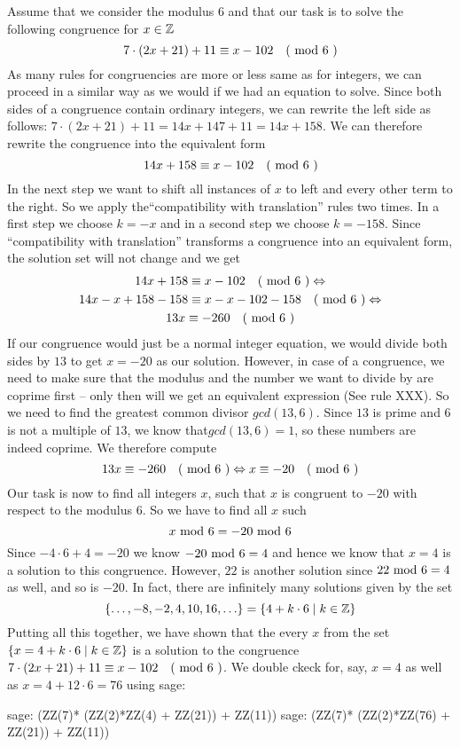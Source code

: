 \begin{example}
\label{example_first_congruence}
Assume that we consider the modulus $6$ and that our task is to solve the following congruence for $x\in \mathbb{Z}$
$$7\cdot(2x+21) + 11 \equiv x-102 \quad \text{( mod } 6 \text{ )}$$
As many rules for congruencies are more or less same as for integers, we can proceed in a  similar way as we would if we had an equation to solve.
Since both sides of a congruence contain ordinary integers, we can rewrite the left side as follows: $7\cdot(2x+21) + 11 = 14x + 147 + 11 = 14x +158$. We can therefore rewrite the congruence into the equivalent form
$$14x +158 \equiv x-102 \quad \text{( mod } 6 \text{ )}$$
In the next step we want to shift all instances of $x$ to left and every other term to the right. So we apply the``compatibility with translation'' rules two times. In a first step we choose $k=-x$ and in a second step we choose $k=-158$. Since ``compatibility with translation'' transforms a congruence into an equivalent form, the solution set will not change and we get
\begin{multline*}
14x +158 \equiv x-102 \quad \text{( mod } 6 \text{ )} \Leftrightarrow\\
14x-x +158-158 \equiv x-x-102-158 \quad \text{( mod } 6 \text{ )} \Leftrightarrow \\
13x \equiv -260 \quad \text{( mod } 6 \text{ )}
\end{multline*}
If our congruence would just be a normal integer equation, we would divide both sides by $13$ to get $x=-20$ as our solution. However, in case of a congruence, we need to make sure that the modulus and the number we want to divide by are coprime first – only then will we get an equivalent expression (See rule XXX). So we need to find the greatest common divisor $gcd(13,6)$. Since $13$ is prime and $6$ is not a multiple of $13$, we know that$gcd(13,6)=1$, so these numbers are indeed coprime. We therefore compute
$$
13x \equiv -260 \quad \text{( mod } 6 \text{ )} \Leftrightarrow x \equiv -20 \quad \text{( mod } 6 \text{ )}
$$
Our task is now to find all integers $x$, such that $x$ is congruent to $-20$ with respect to the modulus $6$. So we have to find all $x$ such
$$
x \text{ mod } 6 = -20 \text{ mod } 6
$$
Since $-4\cdot 6 +4 = -20$ we know $ -20 \text{ mod } 6 = 4$ and hence we know that $x=4$ is a solution to this congruence. However, $22$ is another solution since $ 22 \text{ mod } 6 = 4$ as well, and so is $-20$. In fact, there are infinitely many solutions given by the set
$$
\{\ldots, -8,-2, 4,10, 16,\ldots\} = \{4+k\cdot 6 \;|\; k\in \mathbb{Z}\}
$$
Putting all this together, we have shown that the every $x$ from the set $\{x=4+k\cdot 6 \;|\; k\in \mathbb{Z}\}$ is a solution to the congruence $7\cdot(2x+21) + 11 \equiv x-102 \quad \text{( mod } 6 \text{ )}$. We double ckeck for, say, $x=4$ as well as $x=4 + 12\cdot 6 = 76$ using sage:
\begin{sagecommandline}
sage: (ZZ(7)* (ZZ(2)*ZZ(4) + ZZ(21)) + ZZ(11))  %
sage: (ZZ(7)* (ZZ(2)*ZZ(76) + ZZ(21)) + ZZ(11))  %
\end{sagecommandline}
\end{example}
